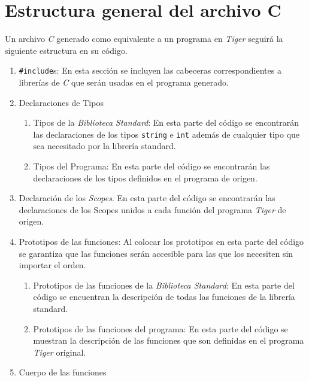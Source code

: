 \documentclass{article}
\begin{document}

\section{Estructura general del archivo C}

Un archivo \textit{C} generado como equivalente a un programa en \textit{Tiger}
seguirá la siguiente estructura en su código.

\begin{enumerate}
    \item \texttt{\#include}s: En esta sección se incluyen las cabeceras
    correspondientes a librerías de \textit{C} que serán usadas en el programa
    generado.
    \item Declaraciones de Tipos
        \begin{enumerate}
            \item Tipos de la  \textit{Biblioteca Standard}: En esta parte del
            código se encontrarán las declaraciones de los tipos
            \texttt{string} e \texttt{int} además de cualquier tipo que sea
            necesitado por la librería standard.
      		\item Tipos del Programa: En esta parte del código se encontrarán
      		las declaraciones de los tipos definidos en el programa de origen.
  		\end{enumerate}
  	\item Declaración de los \textit{Scopes}. En esta parte del código se
  	encontrarán las declaraciones de los Scopes unidos a cada función del
  	programa \textit{Tiger} de origen.
  	\item Prototipos de las funciones: Al colocar los prototipos en esta parte
  	del código se garantiza que las funciones serán accesible para las que los
  	necesiten sin importar el orden.
        \begin{enumerate}
            \item Prototipos de las funciones de la \textit{Biblioteca
            Standard}: En esta parte del código se encuentran la descripción de
            todas las funciones de la librería standard.
            \item Prototipos de las funciones del programa: En esta parte del
            código se muestran la descripción de las funciones que son
            definidas en el programa \textit{Tiger} original.
        \end{enumerate}
    \item Cuerpo de las funciones

\end{enumerate}
\end{document}
